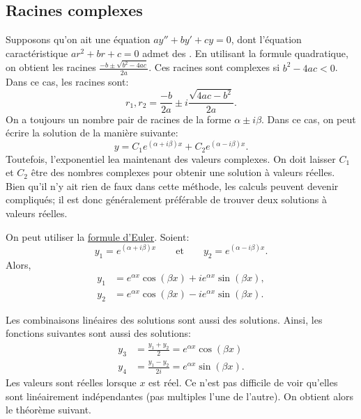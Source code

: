 \subsection{Racines complexes}

Supposons qu'on ait une équation  $ay'' + by' + cy = 0$, dont  l'équation caractéristique 
$a r^2 + b r + c = 0$ admet des .
En utilisant la formule quadratique, on obtient les racines 
$\frac{-b \pm \sqrt{b^2 - 4ac}}{2a}$.
Ces racines sont complexes si $b^2 - 4ac < 0$.  Dans ce cas, les racines sont:
\begin{equation*}
r_1, r_2 = \frac{-b}{2a} \pm i\frac{\sqrt{4ac - b^2}}{2a} .
\end{equation*}
On a toujours un nombre pair de racines de la forme $\alpha \pm i
\beta$. Dans ce cas, on peut écrire la solution de la manière suivante:
\begin{equation*}
y = C_1 e^{(\alpha+i\beta)x} + C_2 e^{(\alpha-i\beta)x} .
\end{equation*}
Toutefois, l'exponentiel lea maintenant des valeurs complexes. On doit laisser  
$C_1$ et $C_2$ être des nombres complexes pour obtenir une solution à valeurs réelles. Bien qu'il n'y ait rien de faux dans cette méthode, les calculs peuvent devenir compliqués; il est donc généralement préférable de trouver deux solutions à valeurs réelles.

On peut utiliser la  \hyperref[eulersformula]{formule d'Euler}. Soient: 
\begin{equation*}
y_1 = e^{(\alpha+i\beta)x} \qquad \text{et} \qquad y_2 = e^{(\alpha-i\beta)x} .
\end{equation*}
Alors,  
\begin{align*}
y_1 & = e^{\alpha x} \cos (\beta x) + i e^{\alpha x} \sin (\beta x) , \\
y_2 & = e^{\alpha x} \cos (\beta x) - i e^{\alpha x} \sin (\beta x) .
\end{align*}

Les combinaisons linéaires des solutions sont aussi des solutions. Ainsi, les fonctions suivantes sont aussi des solutions:
\begin{align*}
y_3 & = \frac{y_1 + y_2}{2} = e^{\alpha x} \cos (\beta x)  \\ 
y_4 & = \frac{y_1 - y_2}{2i} = e^{\alpha x} \sin (\beta x) .
\end{align*}
Les valeurs sont réelles lorsque $x$ est réel. Ce n'est pas difficile de voir qu'elles sont linéairement indépendantes (pas multiples l'une de l'autre). On obtient alors le théorème suivant.

